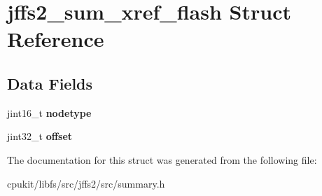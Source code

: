 \hypertarget{structjffs2__sum__xref__flash}{}\section{jffs2\+\_\+sum\+\_\+xref\+\_\+flash Struct Reference}
\label{structjffs2__sum__xref__flash}
\subsection*{Data Fields}
\begin{DoxyCompactItemize}
\item 
\mbox{\label{structjffs2__sum__xref__flash_afb4119037c3bbae8ef26eb30f6ec313b}} 
jint16\+\_\+t {\bfseries nodetype}
\item 
\mbox{\label{structjffs2__sum__xref__flash_a04960a120287ff0a09eb9661add0d949}} 
jint32\+\_\+t {\bfseries offset}
\end{DoxyCompactItemize}


The documentation for this struct was generated from the following file\+:\begin{DoxyCompactItemize}
\item 
cpukit/libfs/src/jffs2/src/summary.\+h\end{DoxyCompactItemize}
